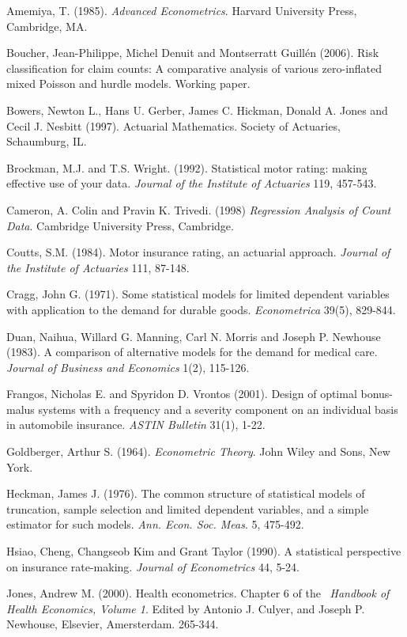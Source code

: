 \begin{multicols}{2}



Amemiya, T. (1985). \textit{Advanced Econometrics}. Harvard
University Press, Cambridge, MA.

Boucher, Jean-Philippe, Michel Denuit and Montserratt Guill\'{e}n
(2006). Risk classification for claim counts: A comparative analysis
of various zero-inflated mixed Poisson and hurdle models. Working
paper.

Bowers, Newton L., Hans U. Gerber, James C. Hickman, Donald A. Jones
and Cecil J. Nesbitt (1997). Actuarial Mathematics. Society of
Actuaries, Schaumburg, IL.

Brockman, M.J. and T.S. Wright. (1992). Statistical motor rating:
making effective use of your data. {\it Journal of the Institute of
Actuaries} 119, 457-543.

Cameron, A. Colin and Pravin K. Trivedi. (1998) \textit{Regression
Analysis of Count Data}. Cambridge University Press, Cambridge.

Coutts, S.M. (1984). Motor insurance rating, an actuarial approach.
{\it Journal of the Institute of Actuaries} 111, 87-148.

Cragg, John G. (1971). Some statistical models for limited dependent
variables with application to the demand for durable goods.
\textit{Econometrica} 39(5), 829-844.

Duan, Naihua, Willard G. Manning, Carl N. Morris and Joseph P.
Newhouse (1983). A comparison of alternative models for the demand
for medical care. \textit{Journal of Business and Economics} 1(2),
115-126.

Frangos, Nicholas E. and Spyridon D. Vrontos (2001). Design of
optimal bonus-malus systems with a frequency and a severity
component on an individual basis in automobile insurance. {\it ASTIN
Bulletin} 31(1), 1-22.

Goldberger, Arthur S. (1964). \textit{Econometric Theory}. John
Wiley and Sons, New York.

Heckman, James J. (1976). The common structure of statistical models
of truncation, sample selection and limited dependent variables, and
a simple estimator for such models. \textit{Ann. Econ. Soc. Meas}.
5, 475-492.

Hsiao, Cheng, Changseob Kim and Grant Taylor (1990). A statistical
perspective on insurance rate-making. \textit{Journal of
Econometrics} 44, 5-24.

Jones, Andrew M. (2000). Health econometrics. Chapter 6 of the\ \textit{%
Handbook of Health Economics, Volume 1}. Edited by Antonio J.
Culyer, and Joseph P. Newhouse, Elsevier, Amersterdam. 265-344.


\end{multicols}
